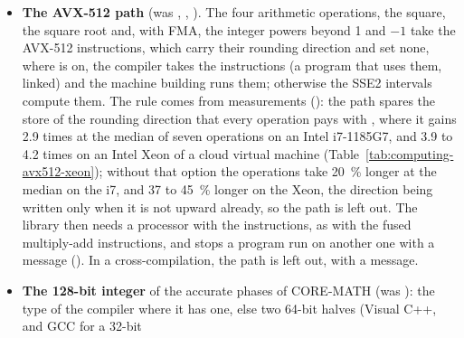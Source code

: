 \begin{itemize}
  objects of GAOL built so by GCC~16.2 have no instruction on a 256-bit
  register (). In a cross-compilation, where
  no program can be run, they are left out, with a message; GAOL then calls the
   of the C library, or its own  where that one is
  wrong (). A universal build
  of macOS leaves the flag out, its arm64 part refusing  while
  it has the instructions without a flag: the x86\_64 part is then built
  without them, runs on any x86\_64 processor, Rosetta 2 included, but
  CORE-MATH and the exact products of GAOL call the  of the
  system library, and the integer powers beyond 1 and $-1$ do not take the
  packed kernel that uses the instruction; a build for x86\_64 alone
  () takes  where the
  machine building runs a program compiled with it.
%
\item[$\bullet$] \textbf{The AVX-512 path} (was
  , ,
  ). The four arithmetic operations, the square,
  the square root and, with FMA, the integer powers beyond 1 and $-1$ take
  the AVX-512 instructions, which carry their rounding direction and set
  none, where  is on, the compiler takes the
  instructions (a program that uses them, linked) and the machine building
  runs them; otherwise the SSE2 intervals compute them. The rule comes from
  measurements (): the path spares the store of the
  rounding direction that every operation pays with
  , where it gains 2.9 times at the median
  of seven operations on an Intel i7-1185G7, and 3.9 to 4.2 times on an Intel
  Xeon of a cloud virtual machine (Table~\ref{tab:computing-avx512-xeon});
  without that option the operations take 20~\% longer at the median on the
  i7, and 37 to 45~\% longer on the Xeon, the direction being written only
  when it is not upward already, so the path is left out. The library
  then needs a processor with the instructions, as with the fused
  multiply-add instructions, and  stops a program run on
  another one with a message (). In a cross-compilation,
  the path is left out, with a message.
%
\item[$\bullet$] \textbf{The 128-bit integer} of the accurate phases of
  CORE-MATH (was ): the type of the compiler
  where it has one, else two 64-bit halves (Visual C++, and GCC for a 32-bit

\end{itemize}

